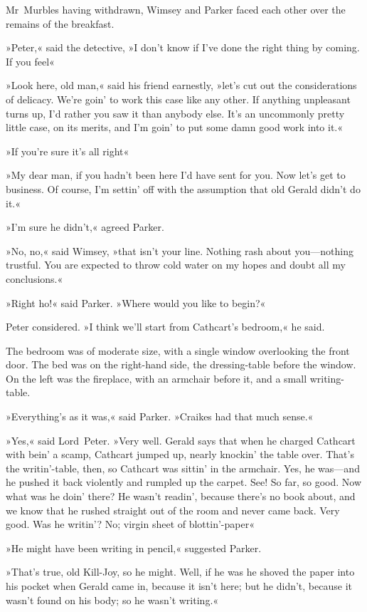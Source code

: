 Mr~Murbles having withdrawn, Wimsey and Parker faced each other over the remains of the breakfast.

»Peter,« said the detective, »I don't know if I've done the right thing by coming. If you feel\longdash«

»Look here, old man,« said his friend earnestly, »let's cut out the considerations of delicacy. We're goin' to work this case like any other. If anything unpleasant turns up, I'd rather you saw it than anybody else. It's an uncommonly pretty little case, on its merits, and I'm goin' to put some damn good work into it.«

»If you're sure it's all right\longdash«

»My dear man, if you hadn't been here I'd have sent for you. Now let's get to business. Of course, I'm settin' off with the assumption that old Gerald didn't do it.«

»I'm sure he didn't,« agreed Parker.

»No, no,« said Wimsey, »that isn't your line. Nothing rash about you—nothing trustful. You are expected to throw cold water on my hopes and doubt all my conclusions.«

»Right ho!« said Parker. »Where would you like to begin?«

Peter considered. »I think we'll start from Cathcart's bedroom,« he said.

The bedroom was of moderate size, with a single window overlooking the front door. The bed was on the right-hand side, the dressing-table before the window. On the left was the fireplace, with an armchair before it, and a small writing-table.

»Everything's as it was,« said Parker. »Craikes had that much sense.«

»Yes,« said Lord~Peter. »Very well. Gerald says that when he charged Cathcart with bein' a scamp, Cathcart jumped up, nearly knockin' the table over. That's the writin'-table, then, so Cathcart was sittin' in the armchair. Yes, he was—and he pushed it back violently and rumpled up the carpet. See! So far, so good. Now what was he doin' there? He wasn't readin', because there's no book about, and we know that he rushed straight out of the room and never came back. Very good. Was he writin'? No; virgin sheet of blottin'-paper\longdash«

»He might have been writing in pencil,« suggested Parker.

»That's true, old Kill-Joy, so he might. Well, if he was he shoved the paper into his pocket when Gerald came in, because it isn't here; but he didn't, because it wasn't found on his body; so he wasn't writing.«

